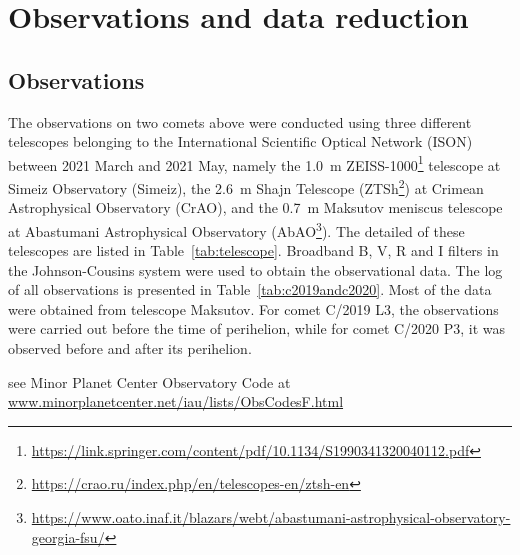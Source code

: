 \section{Observations and data reduction} \label{sec:obs_data}

\subsection{Observations}

The observations on two comets  above were conducted using three different telescopes belonging to the International Scientific Optical Network (ISON) between 2021 March and 2021 May, namely the {\qty{1.0}{\m}} ZEISS-1000\footnote{\url{https://link.springer.com/content/pdf/10.1134/S1990341320040112.pdf}} 
telescope at Simeiz Observatory (Simeiz), the {\qty{2.6}{\m}} Shajn Telescope (ZTSh\footnote{\url{https://crao.ru/index.php/en/telescopes-en/ztsh-en}}) 
at Crimean Astrophysical Observatory (CrAO), and the {\qty{0.7}{\m}} Maksutov meniscus telescope at Abastumani Astrophysical Observatory (AbAO\footnote{\url{https://www.oato.inaf.it/blazars/webt/abastumani-astrophysical-observatory-georgia-fsu/}}). 
The detailed  of these telescopes are listed in Table~\ref{tab:telescope}. Broadband B, V, R and I filters in the Johnson-Cousins system were used to obtain the observational data. The log of all observations is presented in Table~\ref{tab:c2019andc2020}. Most of the data were obtained from telescope Maksutov. For comet C/2019 L3, the observations were carried out before the time of perihelion, while for comet C/2020 P3, it was observed before and after its perihelion. 

\begin{table}
    \centering
    \caption{Information of  used. }\label{tab:telescope}
    \begin{threeparttable}
        \begin{tablenotes}
            \item[1] see Minor Planet Center Observatory Code at \\
            \url{www.minorplanetcenter.net/iau/lists/ObsCodesF.html}
        \end{tablenotes}
    \end{threeparttable}
\end{table}


